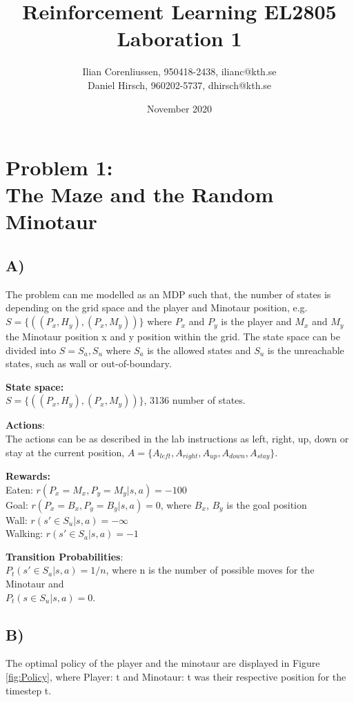 \documentclass{article}
\title{Reinforcement Learning EL2805\\
       Laboration 1}
\author{Ilian Corenliussen, 950418-2438, ilianc@kth.se\\ 
        Daniel Hirsch, 960202-5737, dhirsch@kth.se}
\date{November 2020}
\begin{document}
\maketitle

\section*{Problem 1: \\
        The Maze and the Random Minotaur}
\subsection*{A)}
The problem can me modelled as an MDP such that, the number of states is depending on the grid space and the player and Minotaur position, e.g. $S = \{((P_x, H_y),(P_x, M_y) )\} $ where $P_x$ and $P_y$ is the player and $M_x$ and $M_y$ the Minotaur position x and y position within the grid. The state space can be divided into $S = {S_a, S_u}$ where $S_a$ is the allowed states and $S_u$ is the unreachable states, such as wall or out-of-boundary.


\textbf{State space:}\\
$S = \{((P_x, H_y),(P_x, M_y) )\} $, 3136 number of states. 

\textbf{Actions}: \\
The actions can be as described in the lab instructions as left, right, up, down or stay at the current position, $A = \{ A_{left}, A_{right}, A_{up}, A_{down}, A_{stay} \}$. 

\textbf{Rewards:} \\
Eaten: $r(P_x = M_x , P_y = M_y |s,a) = -100 $\\ 
Goal: $r(P_x = B_x , P_y = B_y |s,a) = 0 $, where $B_x$, $B_y$ is the goal position\\
Wall: $r(s'\in S_u |s,a) = -\infty $\\
Walking: $r(s'\in S_a |s,a) = -1 $

\textbf{Transition Probabilities}:\\
$P_t(s' \in S_a |s,a) = 1/n$, where n is the number of possible moves for the Minotaur and \\$P_t(s \in S_u |s,a) = 0$. 

\subsection*{B)}
The optimal policy of the player and the minotaur are displayed in Figure \ref{fig:Policy}, where Player: t and Minotaur: t was their respective position for the timestep t. 
\end{document}
